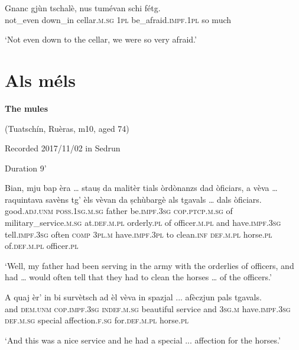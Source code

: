 \begin{linenumbers}
\gll  Gnanc gjùn tschalè, nus tumévan schi fétg.  \\
 not\_even down\_in cellar.\textsc{m.sg} \textsc{1pl} be\_afraid.\textsc{impf.1pl} so much\\
\end{linenumbers}
\medskip
\glt `Not even down to the cellar, we were so very afraid.'
\medskip

\section{Als méls}\label{sec:8.7}
\textbf{The mules}

\noindent
(Tuatschín, Ruèras, m10, aged 74)

\noindent
Recorded 2017/11/02 in Sedrun  

\noindent
Duration 9'

\bigskip

\begin{linenumbers}
\gll  Bian, mju bap èra … stauṣ da malitèr tials òrdònanzs dad òficiars, a vèva … raquintava savèns tg’ èls vèvan da ṣchùbargè als tgavals … dals òficiars.  \\
good.\textsc{adj.unm} \textsc{poss.1sg.m.sg} father be.\textsc{impf.3sg} {} \textsc{cop.ptcp.m.sg} of military\_service.\textsc{m.sg}  at.\textsc{def.m.pl} orderly.\textsc{pl} of officer.\textsc{m.pl}  and have.\textsc{impf.3sg} {} tell.\textsc{impf.3sg} often \textsc{comp} \textsc{3pl.m} have.\textsc{impf.3pl} to clean.\textsc{inf} \textsc{def.m.pl} horse.\textsc{pl} {} of.\textsc{def.m.pl} officer.\textsc{pl}\\
\end{linenumbers}
\medskip
\glt `Well, my father had been serving in the army with the orderlies of officers, and had … would often tell that they had to clean the horses … of the officers.'
\medskip

\begin{linenumbers}
\gll  A quaj èr’ in bi survètsch ad èl vèva in spazjal\footnotemark{} ... afèczjun pals tgavals.  \\
and \textsc{dem.unm} \textsc{cop.impf.3sg} \textsc{indef.m.sg} beautiful service and \textsc{3sg.m}  have.\textsc{impf.3sg} \textsc{def.m.sg} special {} affection.\textsc{f.sg} for.\textsc{def.m.pl} horse.\textsc{pl}\\
\end{linenumbers}
\medskip
\glt `And this was a nice service and he had a special ... affection for  the horses.'
\medskip

